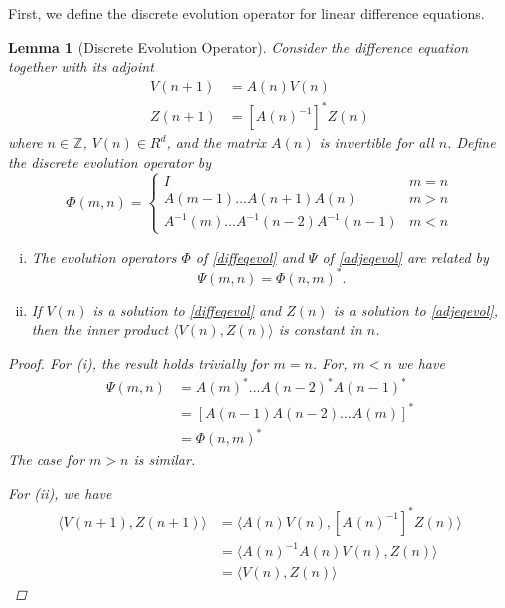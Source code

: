 \documentclass[12pt]{elsarticle}
\def\Z{{\mathbb Z}}
\newtheorem{lemma}{Lemma}
\begin{document}
First, we define the discrete evolution operator for linear difference equations.

\begin{lemma}[Discrete Evolution Operator]\label{evolop}
Consider the difference equation together with its adjoint
\begin{align}
V(n+1) &= A(n) V(n) \label{diffeqevol} \\
Z(n+1) &= [A(n)^{-1}]^* Z(n) \label{adjeqevol}
\end{align}
where $n \in \Z$, $V(n) \in R^d$, and the matrix $A(n)$ is invertible for all $n$. Define the discrete evolution operator by
\begin{equation}\label{evol}
\Phi(m, n) = 
\begin{cases}
I & m = n \\
A(m-1) \dots A(n+1) A(n) & m > n \\
A^{-1}(m) \dots A^{-1}(n-2) A^{-1}(n-1) & m < n
\end{cases}
\end{equation}
\begin{enumerate}[(i)]
\item The evolution operators $\Phi$ of \eqref{diffeqevol} and $\Psi$ of \eqref{adjeqevol} are related by
\begin{equation}\label{adjevol}
\Psi(m, n) = \Phi(n, m)^*.
\end{equation}
\item If $V(n)$ is a solution to \eqref{diffeqevol} and $Z(n)$ is a solution to \eqref{adjeqevol}, then the inner product $\langle V(n), Z(n) \rangle$ is constant in $n$.
\end{enumerate}

\begin{proof}
For (i), the result holds trivially for $m = n$. For, $m < n$ we have
\begin{align*}
\Psi(m, n) &= A(m)^* \dots A(n-2)^* A(n-1)^* \\
&= [A(n-1) A(n-2) \dots A(m)]^* \\
&= \Phi(n, m)^*
\end{align*}
The case for $m > n$ is similar.

For (ii), we have
\begin{align*}
\langle V(n+1), Z(n+1) \rangle &= 
\langle A(n) V(n), [A(n)^{-1}]^* Z(n) \rangle \\
&= \langle A(n)^{-1} A(n) V(n), Z(n) \rangle \\
&= \langle V(n), Z(n) \rangle
\end{align*}
\end{proof}
\end{lemma}
\end{document}
